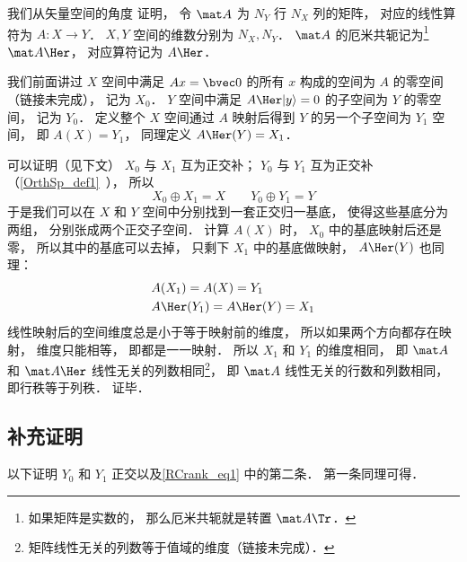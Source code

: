 

我们从矢量空间的角度 证明， 令 $\mat A$ 为 $N_Y$ 行 $N_X$ 列的矩阵， 对应的线性算符为 $A: X\to Y$． $X, Y$ 空间的维数分别为 $N_X, N_Y$． $\mat A$ 的厄米共轭记为\footnote{如果矩阵是实数的， 那么厄米共轭就是转置 $\mat A\Tr$．} $\mat A\Her$， 对应算符记为 $A\Her$．

我们前面讲过 $X$ 空间中满足 $A {x} = \bvec 0$ 的所有 ${x}$ 构成的空间为 $A$ 的零空间（链接未完成）， 记为 $X_0$． $Y$ 空间中满足 $A\Her |y\rangle = 0$ 的子空间为 $Y$ 的零空间， 记为 $Y_0$． 定义整个 $X$ 空间通过 $A$ 映射后得到 $Y$ 的另一个子空间为 $Y_1$ 空间， 即 $A(X) = Y_1$， 同理定义 $A\Her(Y) = X_1$． %

可以证明（见下文） $X_0$ 与 $X_1$ 互为正交补； $Y_0$ 与 $Y_1$ 互为正交补（\autoref{OrthSp_def1}~）， 所以
\begin{equation}\label{RCrank_eq1}
X_0 \oplus X_1 = X
\qquad
Y_0 \oplus Y_1 = Y
\end{equation}
于是我们可以在 $X$ 和 $Y$ 空间中分别找到一套正交归一基底， 使得这些基底分为两组， 分别张成两个正交子空间． 计算 $A(X)$ 时， $X_0$ 中的基底映射后还是零， 所以其中的基底可以去掉， 只剩下 $X_1$ 中的基底做映射， $A\Her(Y)$ 也同理：
\begin{equation}
\begin{aligned}
&A(X_1) = A(X) = Y_1\\
&A\Her(Y_1) = A\Her(Y) = X_1
\end{aligned}
\end{equation}
线性映射后的空间维度总是小于等于映射前的维度， 所以如果两个方向都存在映射， 维度只能相等， 即都是一一映射． 所以 $X_1$ 和 $Y_1$ 的维度相同， 即 $\mat A$ 和 $\mat A\Her$ 线性无关的列数相同\footnote{矩阵线性无关的列数等于值域的维度（链接未完成）．}， 即 $\mat A$ 线性无关的行数和列数相同， 即行秩等于列秩． 证毕．

\subsection{补充证明}
以下证明 $Y_0$ 和 $Y_1$ 正交以及\autoref{RCrank_eq1} 中的第二条． 第一条同理可得．

